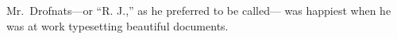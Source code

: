 \hsize 2.5in  
Mr.~Drofnats---or ``R. J.,'' as
he preferred to be called---%
was happiest when he was at work
typesetting beautiful documents.
\bye
